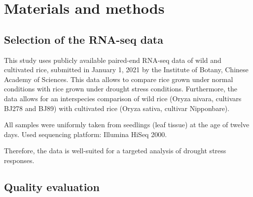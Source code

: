 \section{Materials and methods}

\subsection{Selection of the RNA-seq data}

This study uses publicly available paired-end RNA-seq data of wild and cultivated rice, submitted in January 1, 2021 by the Institute of Botany, Chinese Academy of Sciences. This data allows to compare rice grown under normal conditions with rice grown under drought stress conditions. Furthermore, the data allows for an interspecies comparison of wild rice (Oryza nivara, cultivars BJ278 and BJ89) with cultivated rice (Oryza sativa, cultivar Nipponbare).

All samples were uniformly taken from seedlings (leaf tissue) at the age of twelve days. Used sequencing platform: Illumina HiSeq 2000.

Therefore, the data is well-suited for a targeted analysis of drought stress responses.


\subsection{Quality evaluation}

